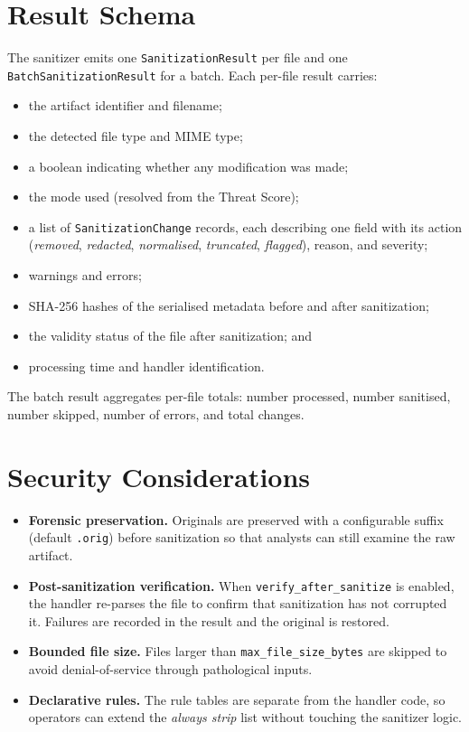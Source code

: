 \documentclass[12pt, a4paper]{report}
\begin{document}
\section{Result Schema}

The sanitizer emits one \texttt{SanitizationResult} per file and one
\texttt{BatchSanitizationResult} for a batch. Each per-file result
carries:

\begin{itemize}
    \item the artifact identifier and filename;
    \item the detected file type and MIME type;
    \item a boolean indicating whether any modification was made;
    \item the mode used (resolved from the Threat Score);
    \item a list of \texttt{SanitizationChange} records, each
          describing one field with its action (\emph{removed},
          \emph{redacted}, \emph{normalised}, \emph{truncated},
          \emph{flagged}), reason, and severity;
    \item warnings and errors;
    \item SHA-256 hashes of the serialised metadata before and after
          sanitization;
    \item the validity status of the file after sanitization; and
    \item processing time and handler identification.
\end{itemize}

The batch result aggregates per-file totals: number processed,
number sanitised, number skipped, number of errors, and total changes.

\section{Security Considerations}

\begin{itemize}
    \item \textbf{Forensic preservation.} Originals are preserved with
          a configurable suffix (default \texttt{.orig}) before
          sanitization so that analysts can still examine the raw
          artifact.
    \item \textbf{Post-sanitization verification.} When
          \texttt{verify\_after\_sanitize} is enabled, the handler
          re-parses the file to confirm that sanitization has not
          corrupted it. Failures are recorded in the result and the
          original is restored.
    \item \textbf{Bounded file size.} Files larger than
          \texttt{max\_file\_size\_bytes} are skipped to avoid
          denial-of-service through pathological inputs.
    \item \textbf{Declarative rules.} The rule tables are separate from
          the handler code, so operators can extend the \emph{always
          strip} list without touching the sanitizer logic.
\end{itemize}
\end{document}
